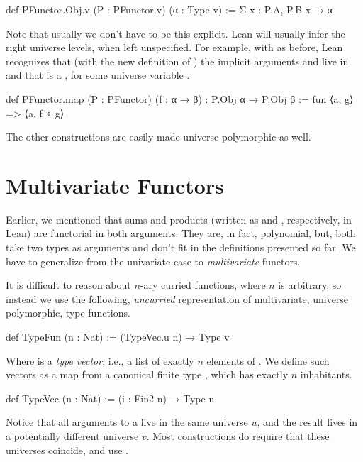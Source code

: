 \begin{leancode}
    def PFunctor.Obj.{v} (P : PFunctor.{v}) (α : Type v)
        := Σ x : P.A, P.B x → α
\end{leancode}

Note that usually we don't have to be this explicit. Lean will usually infer the right universe levels, when left unspecified.
For example, with  as before, Lean recognizes that (with the new definition of ) the implicit arguments  and  live in  and that  is a , for some universe variable .
\begin{leancode}
    def PFunctor.map (P : PFunctor) (f : α → β) : P.Obj α → P.Obj β 
        := fun ⟨a, g⟩ => ⟨a, f ∘ g⟩    
\end{leancode}

The other constructions are easily made universe polymorphic as well.








\section{Multivariate Functors}
\label{sec:mvfunctor}

Earlier, we mentioned that sums and products (written as  and , respectively, in Lean) are functorial in both arguments.
They are, in fact, polynomial, but, both take two types as arguments and don't fit in the definitions presented so far. We have to generalize from the univariate case to \emph{multivariate} functors.

It is difficult to reason about $n$-ary curried functions, where $n$ is arbitrary, so instead we use the following, \emph{uncurried} representation of multivariate, universe polymorphic, type functions.

\begin{leancode}
    def TypeFun (n : Nat) := (TypeVec.{u} n) → Type v
\end{leancode}
Where  is a \emph{type vector}, i.e., a list of exactly $n$ elements of .
We define such vectors as a map from a canonical finite type , which has exactly $n$ inhabitants.
\begin{leancode}
    def TypeVec (n : Nat) := (i : Fin2 n) → Type u
\end{leancode}
Notice that all arguments to a  live in the same universe $u$, and the result lives in a potentially different universe $v$. 
Most constructions do require that these universes coincide, and use .

